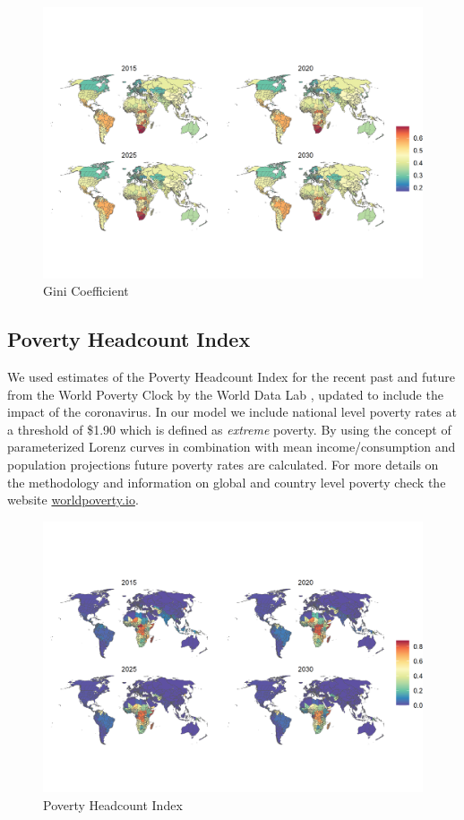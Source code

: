 \documentclass{article}
\begin{document}
\begin{figure}[H]
  \centering
  \includegraphics[width=\linewidth]{img/covars/gini.png}
  \caption{Gini Coefficient}
\end{figure}

\subsection{Poverty Headcount Index}
We used estimates of the Poverty Headcount Index for the recent past and future from the World Poverty Clock by the World Data Lab \citep{Cuaresma2018}, updated to include the impact of the coronavirus. In our model we include national level poverty rates at a threshold of \$1.90 which is defined as \textit{extreme} poverty. By using the concept of parameterized Lorenz curves in combination with mean income/consumption and population projections future poverty rates are calculated. For more details on the methodology and information on global and country level poverty check the website \url{worldpoverty.io}.

\begin{figure}[H]
  \centering
  \includegraphics[width=\linewidth]{img/covars/hci.png}
  \caption{Poverty Headcount Index}
\end{figure}
\end{document}
